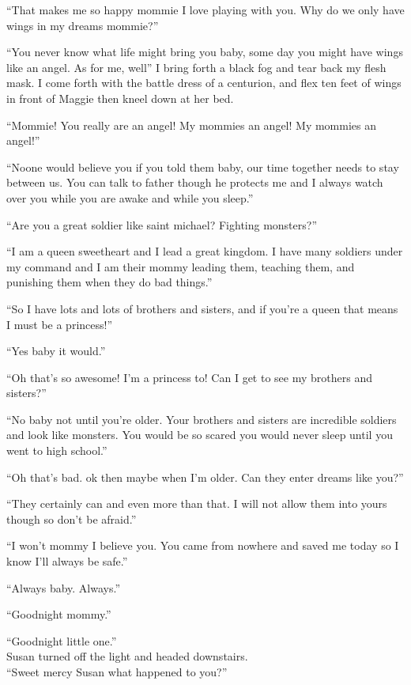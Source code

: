 ``That makes me so happy mommie I love playing with you. Why do we only have wings in my dreams mommie?''

``You never know what life might bring you baby, some day you might have wings like an angel. As for me, well''
I bring forth a black fog and tear back my flesh mask. I come forth with the battle dress of a centurion, and flex ten feet of wings in front of Maggie then kneel down at her bed.

``Mommie! You really are an angel! My mommies an angel! My mommies an angel!''

``Noone would believe you if you told them baby, our time together needs to stay between us. You can talk to father though he protects me and I always watch over you while you are awake and while you sleep.''

``Are you a great soldier like saint michael? Fighting monsters?''

``I am a queen sweetheart and I lead a great kingdom. I have many soldiers under my command and I am their mommy leading them, teaching them, and punishing them when they do bad things.''

``So I have lots and lots of brothers and sisters, and if you're a queen that means I must be a princess!''

``Yes baby it would.''

``Oh that's so awesome! I'm a princess to! Can I get to see my brothers and sisters?''

``No baby not until you're older. Your brothers and sisters are incredible soldiers and look like monsters. You would be so scared you would never sleep until you went to high school.''

``Oh that's bad. ok then maybe when I'm older. Can they enter dreams like you?''

``They certainly can and even more than that. I will not allow them into yours though so don't be afraid.''

``I won't mommy I believe you. You came from nowhere and saved me today so I know I'll always be safe.''

``Always baby. Always.''

``Goodnight mommy.''

``Goodnight little one.''\\

Susan turned off the light and headed downstairs.\\

``Sweet mercy Susan what happened to you?''

